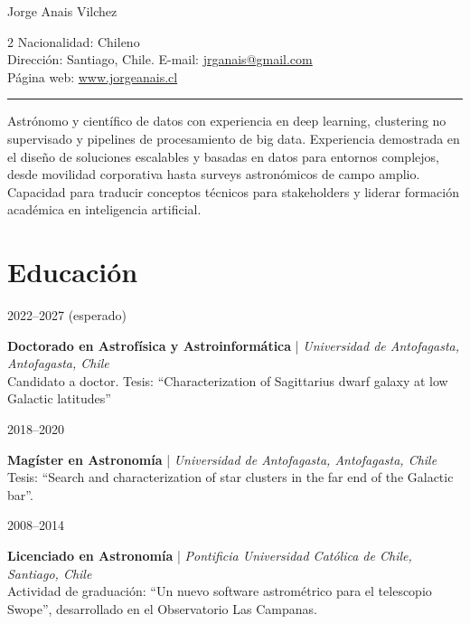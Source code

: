\documentclass[10pt, a4paper]{article}
\newlength{\datebox}
\newlength{\textbox}
\newcommand{\eduitem}[4]{\noindent\parbox[t]{\datebox}{#1}%
    \parbox[t]{\textbox}{\textbf{\textcolor{ViridianGreen}{#2}} | \textit{#3}\\
    \textcolor{Jet}{\small #4}}\par\vspace{0.35cm}}
\begin{document}
{\LARGE \textcolor{DarkCornflowerBlue}{Jorge Anais Vilchez}} \\

\begin{minipage}{\linewidth}
\begin{multicols}{2}
Nacionalidad: Chileno\\
Dirección: Santiago, Chile.
\vfill\eject
E-mail: \href{mailto:jrganais@gmail.com}{jrganais@gmail.com}\\
Página web: \url{www.jorgeanais.cl}\\
\end{multicols}
\end{minipage}

\hrule

\vspace{0.3cm}
\begin{flushright}
  \begin{minipage}{15 cm}
  \textcolor{Jet}{\small Astrónomo y científico de datos con experiencia en deep learning, clustering no supervisado y pipelines de procesamiento de big data. Experiencia demostrada en el diseño de soluciones escalables y basadas en datos para entornos complejos, desde movilidad corporativa hasta surveys astronómicos de campo amplio. Capacidad para traducir conceptos técnicos para stakeholders y liderar formación académica en inteligencia artificial.}
  \end{minipage}
\end{flushright}

\section*{Educación}
\eduitem{2022--2027 (esperado)}{Doctorado en Astrofísica y Astroinformática}{Universidad de Antofagasta, Antofagasta, Chile}{Candidato a doctor. Tesis: \enquote{Characterization of Sagittarius dwarf galaxy at low Galactic latitudes}}
\eduitem{2018--2020}{Magíster en Astronomía}{Universidad de Antofagasta, Antofagasta, Chile}{Tesis: \enquote{Search and characterization of star clusters in the far end of the Galactic bar}.}
\eduitem{2008--2014}{Licenciado en Astronomía}{Pontificia Universidad Católica de Chile, Santiago, Chile}{Actividad de graduación: \enquote{Un nuevo software astrométrico para el telescopio Swope}, desarrollado en el Observatorio Las Campanas.}
\end{document}
